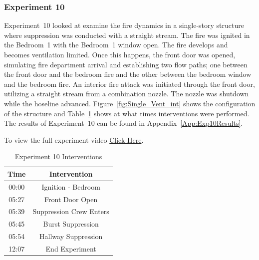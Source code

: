 \documentclass[12pt,oneside]{book}
\begin{document}
\FloatBarrier

\subsubsection{Experiment 10}
Experiment~10 looked at examine the fire dynamics in a single-story structure where suppression was conducted with a straight stream. The fire was ignited in the Bedroom~1 with the Bedroom~1 window open. The fire develops and becomes ventilation limited. Once this happens, the front door was opened, simulating fire department arrival and establishing two flow paths; one between the front door and the bedroom fire and the other between the bedroom window and the bedroom fire. An interior fire attack was initiated through the front door, utilizing a straight stream from a combination nozzle. The nozzle was shutdown while the hoseline advanced. Figure~\ref{fig:Single_Vent_int} shows the configuration of the structure and Table~\ref{Table:Exp10Interventions} shows at what times interventions were performed. The results of Experiment~10 can be found in Appendix~\ref{App:Exp10Results}. 

To view the full experiment video \href{https://player.vimeo.com/video/170510939?autoplay=1}{Click Here}.

\begin{table}[H]
	\centering
	\caption{Experiment 10 Interventions}
	\begin{tabular}{|c|c|} 
		\hline
		Time & Intervention \\ \hline \hline
		00:00 & Ignition - Bedroom \\ \hline
		05:27 & Front Door Open \\ \hline
		05:39 & Suppression Crew Enters\\ \hline
		05:45 & Burst Suppression \\ \hline 
		05:54 & Hallway Suppression \\ \hline
		12:07 & End Experiment\\ \hline
	\end{tabular}
	\label{Table:Exp10Interventions}
\end{table}

\FloatBarrier
\end{document}
